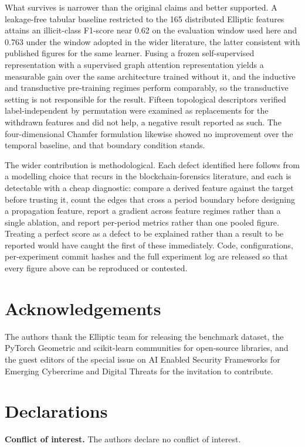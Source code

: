 \documentclass[12pt,a4paper]{article}
\begin{document}
What survives is narrower than the original claims and better
supported. A leakage-free tabular baseline restricted to the 165
distributed Elliptic features attains an illicit-class F1-score
near 0.62 on the evaluation window used here and 0.763 under the
window adopted in the wider literature, the latter consistent
with published figures for the same learner. Fusing a frozen
self-supervised representation with a supervised graph attention
representation yields a measurable gain over the same
architecture trained without it, and the inductive and
transductive pre-training regimes perform comparably, so the
transductive setting is not responsible for the result. Fifteen
topological descriptors verified label-independent by permutation
were examined as replacements for the withdrawn features and did
not help, a negative result reported as such. The
four-dimensional Chamfer formulation likewise showed no
improvement over the temporal baseline, and that boundary
condition stands.

The wider contribution is methodological. Each defect identified
here follows from a modelling choice that recurs in the
blockchain-forensics literature, and each is detectable with a
cheap diagnostic: compare a derived feature against the target
before trusting it, count the edges that cross a period boundary
before designing a propagation feature, report a gradient across
feature regimes rather than a single ablation, and report
per-period metrics rather than one pooled figure. Treating a
perfect score as a defect to be explained rather than a result to
be reported would have caught the first of these immediately.
Code, configurations, per-experiment commit hashes and the full
experiment log are released so that every figure above can be
reproduced or contested.


\section*{Acknowledgements}
The authors thank the Elliptic team for releasing the
benchmark dataset, the PyTorch Geometric and scikit-learn
communities for open-source libraries, and the guest
editors of the special issue on AI Enabled Security
Frameworks for Emerging Cybercrime and Digital Threats
for the invitation to contribute.

\section*{Declarations}
\noindent\textbf{Conflict of interest.}
The authors declare no conflict of interest.
\end{document}
